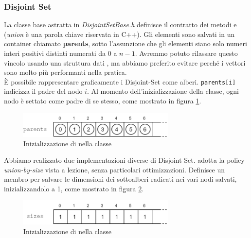\subsubsection{Disjoint Set}

La classe base astratta in \textit{DisjointSetBase.h} definisce il contratto dei metodi  e  (\textit{union} è una parola chiave riservata in C++).
Gli elementi sono salvati in un container  chiamato \textbf{parents}, sotto l'assunzione che gli elementi siano solo numeri interi positivi distinti numerati da $0$ a $n-1$.
Avremmo potuto rilassare questo vincolo usando una struttura dati , ma abbiamo preferito evitare perché i vettori sono molto più performanti nella pratica. \\

È possibile rappresentare graficamente i Disjoint-Set come alberi.
\texttt{parents[i]} indicizza il padre del nodo $i$. Al momento dell'inizializzazione della classe, ogni nodo è settato come padre di se stesso, come mostrato in figura \ref{fig:disjoint-set-base-parents}.

\begin{figure}[htbp]
	\centering
	\includegraphics[width=0.7\textwidth]{./images/DisjointSetParentsVector.png}
	\caption{Inizializzazione di  nella classe }
	\label{fig:disjoint-set-base-parents}
\end{figure}

\noindent Abbiamo realizzato due implementazioni diverse di Disjoint Set.
 adotta la policy \textit{union-by-size} vista a lezione, senza particolari ottimizzazioni. Definisce un membro  per salvare le dimensioni dei sottoalberi radicati nei vari nodi salvati, inizializzandolo a 1, come mostrato in figura \ref{fig:disjoint-set-sizes}.

\begin{figure}[htbp]
	\centering
    \includegraphics[width=0.7\textwidth]{./images/DisjointSetSizesVector.png}
	\caption{Inizializzazione di  nella classe }
	\label{fig:disjoint-set-sizes}
\end{figure}


